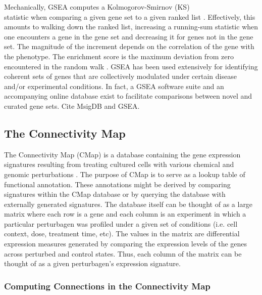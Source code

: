 \documentclass[12pt]{article}
\begin{document}
Mechanically, GSEA computes a Kolmogorov-Smirnov (KS)\\
 statistic when comparing a given gene set to a given ranked list \cite{hollander_wolfe_1975}. Effectively, this amounts to walking down the ranked list, increasing a running-sum statistic when one encounters a gene in the gene set and decreasing it for genes not in the gene set. The magnitude of the increment depends on the correlation of the gene with the phenotype. The enrichment score is the maximum deviation from zero encountered in the random walk \cite{subramanian_gene_2005}. GSEA has been used extensively for identifying coherent sets of genes that are collectively modulated under certain disease and/or experimental conditions. In fact, a GSEA software suite and an accompanying online database exist to facilitate comparisons between novel and curated gene sets.  Cite MsigDB and GSEA. 

\subsection{The Connectivity Map}

The Connectivity Map (CMap) is a database containing the gene expression signatures resulting from treating cultured cells with various chemical and genomic perturbations \cite{lamb_connectivity_2006}. The purpose of CMap is to serve as a lookup table of functional annotation. These annotations might be derived by comparing signatures within the CMap database or by querying the database with externally generated signatures. The database itself can be thought of as a large matrix where each row is a gene and each column is an experiment in which a particular perturbagen was profiled under a given set of conditions (i.e. cell context, dose, treatment time, etc). The values in the matrix are differential expression measures generated by comparing the expression levels of the genes across perturbed and control states. Thus, each column of the matrix can be thought of as a given perturbagen's expression signature.

\subsubsection{Computing Connections in the Connectivity Map}
\end{document}
